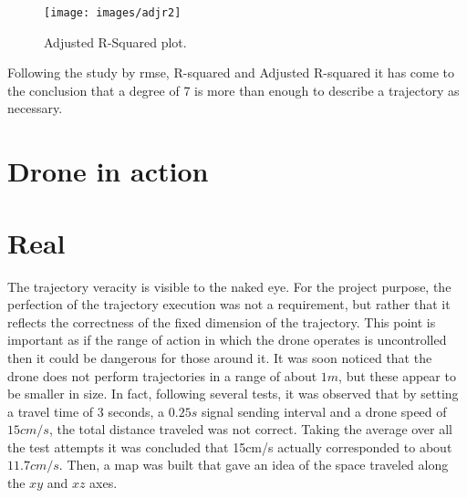 \begin{figure}[H]
	\centering
	\texttt{[image: images/adjr2]}
	\caption[Adjusted R-Squared.]{Adjusted R-Squared plot.}
	\label{fig:adjr2}
\end{figure}

\noindent Following the study by \gls{rmse}, R-squared and Adjusted R-squared it has come to the conclusion that a degree of 7 is more than enough to describe a trajectory as necessary.


\section{Drone in action}
\label{sec:drinact}


\section{Real}
\label{sec:drcontr}

The trajectory veracity is visible to the naked eye. For the project purpose, the perfection of the trajectory execution was not a requirement, but rather that it reflects the correctness of the fixed dimension of the trajectory. This point is important as if the range of action in which the drone operates is uncontrolled then it could be dangerous for those around it. It was soon noticed that the drone does not perform trajectories in a range of about $1m$, but these appear to be smaller in size. In fact, following several tests, it was observed that by setting a travel time of $3$ seconds, a $0.25s$ signal sending interval and a drone speed of $15cm/s$, the total distance traveled was not correct. Taking the average over all the test attempts it was concluded that 15cm/s actually corresponded to about $11.7cm/s$. Then, a map was built that gave an idea of the space traveled along the $xy$ and $xz$ axes. \\